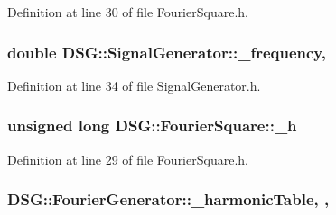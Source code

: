 Definition at line 30 of file Fourier\+Square.\+h.

\hypertarget{classDSG_1_1SignalGenerator_a67e296e3506dcdf09402c667cddff9ac}{
\subsubsection[{\+\_\+frequency}]{\setlength{\rightskip}{0pt plus 5cm}double D\+S\+G\+::\+Signal\+Generator\+::\+\_\+frequency\hspace{0.3cm}{\ttfamily [protected]}, {\ttfamily [inherited]}}}\label{classDSG_1_1SignalGenerator_a67e296e3506dcdf09402c667cddff9ac}


Definition at line 34 of file Signal\+Generator.\+h.

\hypertarget{classDSG_1_1FourierSquare_a2b82df6091ad654fe59a44ff6e18a363}{
\subsubsection[{\+\_\+h}]{\setlength{\rightskip}{0pt plus 5cm}unsigned long D\+S\+G\+::\+Fourier\+Square\+::\+\_\+h\hspace{0.3cm}{\ttfamily [protected]}}}\label{classDSG_1_1FourierSquare_a2b82df6091ad654fe59a44ff6e18a363}


Definition at line 29 of file Fourier\+Square.\+h.

\hypertarget{classDSG_1_1FourierGenerator_aedac2cf90997418836d064c90540249d}{
\subsubsection[{\+\_\+harmonic\+Table}]{ D\+S\+G\+::\+Fourier\+Generator\+::\+\_\+harmonic\+Table\hspace{0.3cm}{\ttfamily [static]}, {\ttfamily [protected]}, {\ttfamily [inherited]}}}\label{classDSG_1_1FourierGenerator_aedac2cf90997418836d064c90540249d}


